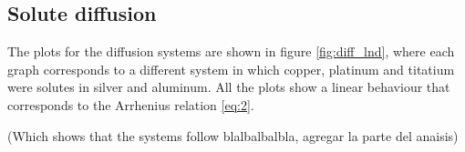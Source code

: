 \subsection{Solute diffusion}

The plots for the diffusion systems are shown in figure \ref{fig:diff_lnd}, where each graph corresponds to a different system in which copper, platinum and titatium were solutes in silver and aluminum. All the plots show a linear behaviour that corresponds to the Arrhenius relation \ref{eq:2}. 

(Which shows that the systems follow blalbalbalbla, agregar la parte del anaisis)

\begin{figure}[H]
 \centering
 \captionsetup{justification=centering}
   \\

\end{figure}
